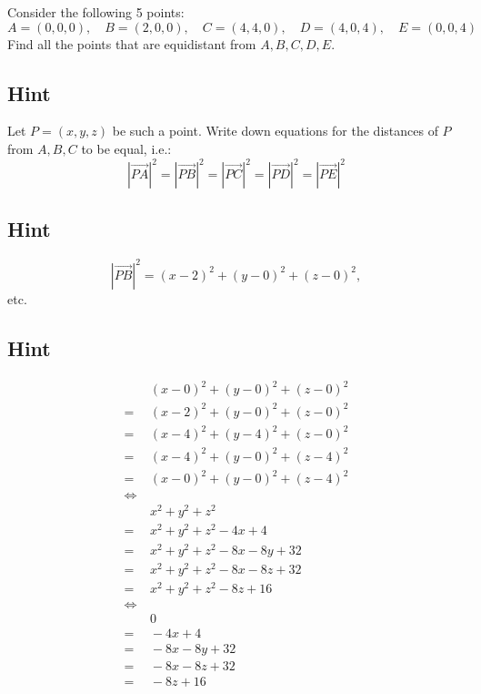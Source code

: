 \documentclass[a4paper,10pt]{article}
\begin{document}
Consider the following 5 points:
\[
    A = (0, 0, 0), \quad B = (2, 0, 0), \quad C = (4, 4, 0), \quad D = (4, 0, 4), \quad E = (0, 0, 4)
\]
Find all the points that are equidistant from $A,B,C,D,E$.

\subsection{Hint}
Let $P=(x,y,z)$ be such a point. Write down equations for the distances of $P$ from $A,B,C$ to be equal, i.e.:
\[
    \left|\overrightarrow{PA}\right|^2 = \left|\overrightarrow{PB}\right|^2 = \left|\overrightarrow{PC}\right|^2 = \left|\overrightarrow{PD}\right|^2 = \left|\overrightarrow{PE}\right|^2
\]

\subsection{Hint}
\[
    \left|\overrightarrow{PB}\right|^2 = (x-2)^2 + (y-0)^2 +(z-0)^2,
\]
etc.

\subsection{Hint}
\begin{align*}
         & \ (x-0)^2 + (y-0)^2 + (z-0)^2    \\
    =    & \ (x-2)^2 + (y-0)^2 + (z-0)^2    \\
    =    & \ (x-4)^2 + (y-4)^2 + (z-0)^2    \\
    =    & \ (x-4)^2 + (y-0)^2 + (z-4)^2    \\
    =    & \ (x-0)^2 + (y-0)^2 + (z-4)^2    \\
    \iff &                                  \\
         & \ x^2 + y^2 + z^2                \\
    =    & \ x^2 + y^2 + z^2 - 4x + 4       \\
    =    & \ x^2 + y^2 + z^2 - 8x - 8y + 32 \\
    =    & \ x^2 + y^2 + z^2 - 8x - 8z + 32 \\
    =    & \ x^2 + y^2 + z^2 - 8z + 16      \\
    \iff &                                  \\
         & \ 0                              \\
    =    & \ - 4x + 4                       \\
    =    & \ - 8x - 8y + 32                 \\
    =    & \ - 8x - 8z + 32                 \\
    =    & \ - 8z + 16                      \\
\end{align*}
\end{document}
